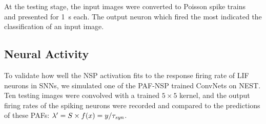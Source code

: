 \documentclass{article}
\begin{document}
	At the testing stage, the input images were converted to Poisson spike trains~\cite{liu2016bench} and presented for 1~s each.
	The output neuron which fired the most indicated the classification of an input image.


	
	\subsection{Neural Activity}
	\label{subsec:activity}
	To validate how well the NSP activation fits to the response firing rate of LIF neurons in SNNs, we simulated one of the PAF-NSP trained ConvNets on NEST.
	Ten testing images were convolved with a trained $5\times5$ kernel, and the output firing rates of the spiking neurons were recorded and compared to the predictions of these PAFs: $\lambda' = S \times f(x) = y/\tau_{\textit{\textrm{syn}}}$.
\end{document}
